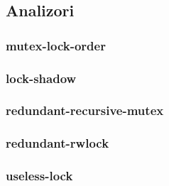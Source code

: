 \subsection{Analizori}\label{analyzers}

\subsubsection{mutex-lock-order}

\subsubsection{lock-shadow}

\subsubsection{redundant-recursive-mutex}

\subsubsection{redundant-rwlock}

\subsubsection{useless-lock}
